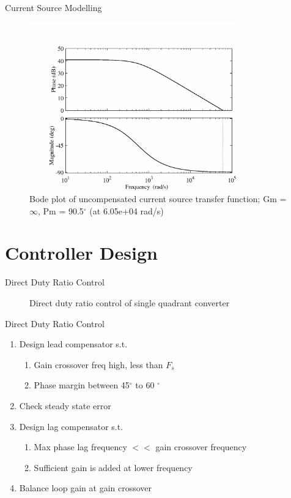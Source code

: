 \documentclass[10pt]{beamer}
\begin{document}
\begin{frame}{Current Source Modelling}
  \begin{figure}
    \centering
    \includegraphics[width=0.8\textwidth]{uncompensated-cs}
    \caption{Bode plot of uncompensated current source transfer function; \hspace{1cm} Gm = $\infty$,  Pm = 90.5$^\circ$ (at 6.05e+04 rad/s)}
    \label{fig:uncomp-cs}
  \end{figure}
\end{frame}

\section{Controller Design}
\begin{frame}{Direct Duty Ratio Control}

\begin{figure}
  \centering
  
  \caption{Direct duty ratio control of single quadrant converter}
  \label{fig:dirduty-1}
\end{figure}
\end{frame}

\begin{frame}{Direct Duty Ratio Control}
\begin{enumerate}
\item Design lead compensator s.t.
\begin{enumerate}
\item Gain crossover freq \textendash{} high, less than $F_s$
\item Phase margin between 45$^\circ$ to 60 $^\circ$
\end{enumerate}
\item Check steady state error
\item Design lag compensator s.t.
\begin{enumerate}
\item Max phase lag frequency $<<$ gain crossover frequency
\item Sufficient gain is added at lower frequency
\end{enumerate}
\item Balance loop gain at gain crossover
\end{enumerate}

\end{frame}
\end{document}
